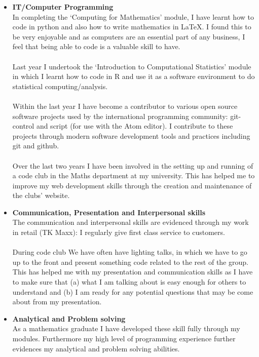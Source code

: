\documentclass[a4paper]{res}
\begin{document}
\begin{resume}
\begin{itemize}
\item \textbf{IT/Computer Programming} \\
In completing the ‘Computing for Mathematics’ module, I have learnt how to code
in python and also how to write mathematics in LaTeX. I found this to be very
enjoyable and as computers are an essential part of any business, I feel that
being able to code is a valuable skill to have. \\
\\
Last year I undertook the ‘Introduction to Computational Statistics’ module in
which I learnt how to code in R and use it as a software environment to do
statistical computing/analysis. \\
\\
Within the last year I have become a contributor to various open source software
projects used by the international programming community: git-control and script
(for use with the Atom editor). I contribute to these projects through modern
software development tools and practices including git and github. \\
\\
Over the last two years I have been involved in the setting up and running of a
code club in the Maths department at my university. This has helped me to
improve my web development skills through the creation and maintenance of the
clubs' website. \\

\item \textbf{Communication, Presentation and Interpersonal skills} \\
The communication and interpersonal skills are evidenced through my work in
retail (TK Maxx): I regularly give first class service to customers.\\
\\
During code club We have often have lighting talks, in which we have to go
up to the front and present something code related to the rest of the group.
This has helped me with my presentation and communication skills as I have to
make sure that (a) what I am talking about is easy enough for others to
understand and (b) I am ready for any potential questions that may be come about
from my presentation. \\

\item \textbf{Analytical and Problem solving} \\
As a mathematics graduate I have developed these skill fully through my
modules. Furthermore my high level of programming experience further
evidences my analytical and problem solving abilities.\\


\end{itemize}
\end{resume}
\end{document}
